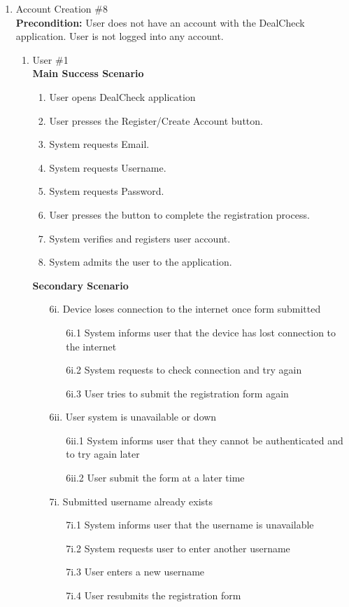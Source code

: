 \documentclass[]{article}
\begin{document}
\begin{enumerate}[{\bf {BE}1.}]
\item Account Creation \#8 \\
{\bf Precondition:} User does not have an account with the DealCheck application. User is not logged into any account.
\begin{enumerate}[{\bf VP1.}]
    \item User \#1 \\
    {\bf Main Success Scenario}
    \begin{enumerate}[1.]
        \item User opens DealCheck application
        \item User presses the Register/Create Account button.
        \item System requests Email.
        \item System requests Username.
        \item System requests Password.
        \item User presses the button to complete the registration process.
        \item System verifies and registers user account.
        \item System admits the user to the application.
        
    \end{enumerate}
    {\bf Secondary Scenario} \\
	\begin{enumerate}
		\item [6i.] Device loses connection to the internet once form submitted
		\begin{enumerate}
			\item [6i.1] System informs user that the device has lost connection to the internet
			\item [6i.2] System requests to check connection and try again
			\item [6i.3] User tries to submit the registration form again
		\end{enumerate}

		\item [6ii.] User system is unavailable or down
		\begin{enumerate}
			\item [6ii.1] System informs user that they cannot be authenticated and to try again later
			\item [6ii.2] User submit the form at a later time
		\end{enumerate}

		\item [7i.] Submitted username already exists
		\begin{enumerate}
			\item [7i.1] System informs user that the username is unavailable
			\item [7i.2] System requests user to enter another username
			\item [7i.3] User enters a new username
			\item [7i.4] User resubmits the registration form
		\end{enumerate}


\end{enumerate}
\end{enumerate}
\end{enumerate}
\end{document}
